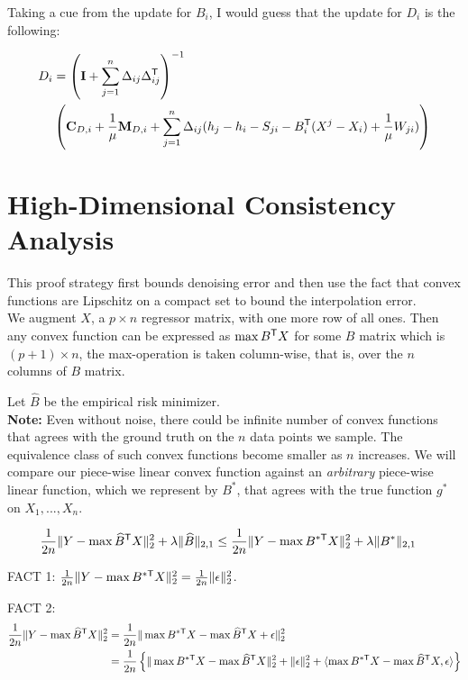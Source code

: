 \documentclass{article}
\begin{document}
Taking a cue from the update for $B_i$, I would guess that the update for $D_i$ is the following:

\begin{align*}
D_i &= \left( \mathbf{I} + \sum_{j=1}^n \Delta_{ij} \Delta_{ij}^{\mathsf{T}} \right)^{-1} \\
	& \left( \mathbf{C}_{D,i} + \frac{1}{\mu} \mathbf{M}_{D,i} + \sum_{j=1}^n \Delta_{ij} ( h_j - h_i - S_{ji} - B_i^{\mathsf{T}} (X^j - X_i) + \frac{1}{\mu} W_{ji} ) \right)
\end{align*}



\section{High-Dimensional Consistency Analysis}
This proof strategy first bounds denoising error and then use the fact that convex functions are Lipschitz on a compact set to bound the interpolation error.\\

We augment $X$, a $p \times n$ regressor matrix, with one more row of all ones. Then any convex function can be expressed as $\max B^{\mathsf{T}} X$ for some $B$ matrix which is $(p+1) \times n$, the max-operation is taken column-wise, that is, over the $n$ columns of $B$ matrix. 

Let $\hat{B}$ be the empirical risk minimizer.\\

\textbf{Note:} Even without noise, there could be infinite number of convex functions that agrees with the ground truth on the $n$ data points we sample. The equivalence class of such convex functions become smaller as $n$ increases. We will compare our piece-wise linear convex function against an \emph{arbitrary} piece-wise linear function, which we represent by $B^*$, that agrees with the true function $g^*$ on $X_1,...,X_n$. 
 
 \begin{align*}
\frac{1}{2n} \| Y - \max \widehat{B}^{\mathsf{T}} X \|_2^2 + \lambda \|\widehat{B}\|_{2,1} &\leq
				\frac{1}{2n}\| Y - \max B^{*\mathsf{T}} X\|_2^2 + \lambda \| B^*\|_{2,1}
\end{align*}

FACT 1: $\frac{1}{2n}\|Y - \max B^{*\mathsf{T}} X\|_2^2 = \frac{1}{2n}\| \epsilon \|_2^2$. 

FACT 2: 
\begin{align*}
\frac{1}{2n} \| Y - \max \widehat{B}^{\mathsf{T}} X \|_2^2  &= \frac{1}{2n} \| \max B^{* \mathsf{T}} X - \max \widehat{B}^{\mathsf{T}} X + \epsilon  \|_2^2\\
&=  \frac{1}{2n} \left\{ \| \max B^{* \mathsf{T}} X - \max \widehat{B}^{\mathsf{T}} X  \|_2^2 + \|\epsilon\|_2^2 + 
\langle \max B^{* \mathsf{T}} X - \max \widehat{B}^{\mathsf{T}} X, \epsilon \rangle \right\}
\end{align*}
\end{document}
